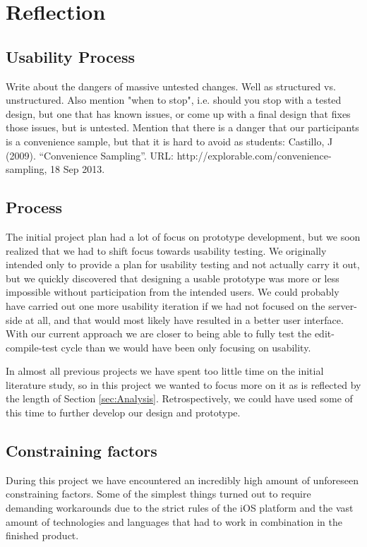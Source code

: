 \chapter{Reflection}
\label{sec:Reflection}

\section{Usability Process}

Write about the dangers of massive untested changes. 
Well as structured vs. unstructured. 
Also mention "when to stop", i.e. should you stop with a tested design, but one that has known issues, or come up with a final design that fixes those issues, but is untested.
Mention that there is a danger that our participants is a convenience sample, but that it is hard to avoid as students: Castillo, J (2009). “Convenience Sampling”. URL: http://explorable.com/convenience-sampling, 18 Sep 2013.


\section{Process}
The initial project plan had a lot of focus on prototype development, but we
soon realized that we had to shift focus towards usability testing. We
originally intended only to provide a plan for usability testing and not
actually carry it out, but we quickly discovered that designing a usable prototype was more or less impossible without
participation from the intended users. We could probably have carried out one more
usability iteration if we had not focused on the server-side at all, and that
would most likely have resulted in a better user interface. With our
current approach we are closer to being able to fully test the
edit-compile-test cycle than we would have been only focusing on usability.

In almost all previous projects we have spent too little time on the initial literature
study, so in this project we wanted to focus more on it as is reflected by the
length of Section \ref{sec:Analysis}. Retrospectively, we could have used some of this time to further develop our design and prototype. 

\section{Constraining factors}
During this project we have encountered an incredibly high amount of unforeseen constraining factors. Some of the simplest things turned out to require demanding workarounds due to the strict rules of the iOS platform and the vast amount of technologies and languages that had to work in combination in the finished product.

